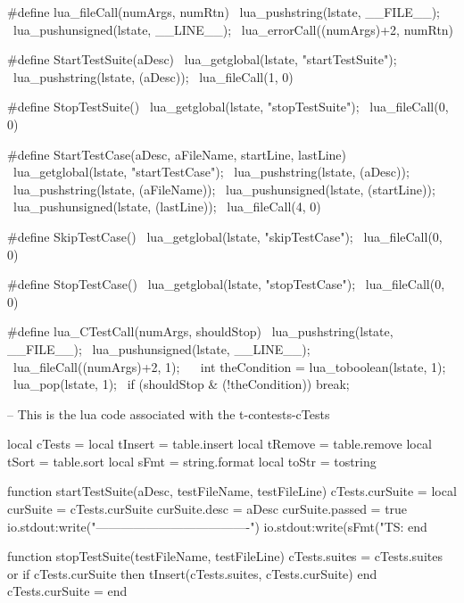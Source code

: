 #define lua_fileCall(numArgs, numRtn)            \
  lua_pushstring(lstate, __FILE__);              \
  lua_pushunsigned(lstate, __LINE__);            \
  lua_errorCall((numArgs)+2, numRtn)

#define StartTestSuite(aDesc)              \
  lua_getglobal(lstate, "startTestSuite"); \
  lua_pushstring(lstate, (aDesc));         \
  lua_fileCall(1, 0)

#define StopTestSuite()                   \
  lua_getglobal(lstate, "stopTestSuite"); \
  lua_fileCall(0, 0)

#define StartTestCase(aDesc, aFileName, startLine, lastLine) \
  lua_getglobal(lstate, "startTestCase");                    \
  lua_pushstring(lstate, (aDesc));                           \
  lua_pushstring(lstate, (aFileName));                       \
  lua_pushunsigned(lstate, (startLine));                     \
  lua_pushunsigned(lstate, (lastLine));                      \
  lua_fileCall(4, 0)

#define SkipTestCase()                   \
  lua_getglobal(lstate, "skipTestCase"); \
  lua_fileCall(0, 0)

#define StopTestCase()                   \
  lua_getglobal(lstate, "stopTestCase"); \
  lua_fileCall(0, 0)

#define lua_CTestCall(numArgs, shouldStop)       \
  lua_pushstring(lstate, __FILE__);              \
  lua_pushunsigned(lstate, __LINE__);            \
  lua_fileCall((numArgs)+2, 1);                  \
  {                                              \
    int theCondition = lua_toboolean(lstate, 1); \
    lua_pop(lstate, 1);                          \
    if (shouldStop & (!theCondition)) break;     \
  }
\stopCHeader

\setLuaCodeStream{cTests}
\startLuaCode
-- This is the lua code associated with the t-contests-cTests

local cTests  = { }
local tInsert = table.insert
local tRemove = table.remove
local tSort   = table.sort
local sFmt    = string.format
local toStr   = tostring

function startTestSuite(aDesc, testFileName, testFileLine)
  cTests.curSuite = { }
  local curSuite  = cTests.curSuite
  curSuite.desc   = aDesc
  curSuite.passed = true
  io.stdout:write("\n-------------------------------------\n")
  io.stdout:write(sFmt("TS: %
end

function stopTestSuite(testFileName, testFileLine)
  cTests.suites = cTests.suites or { }
  if cTests.curSuite then
    tInsert(cTests.suites, cTests.curSuite)
  end
  cTests.curSuite = { }
end

